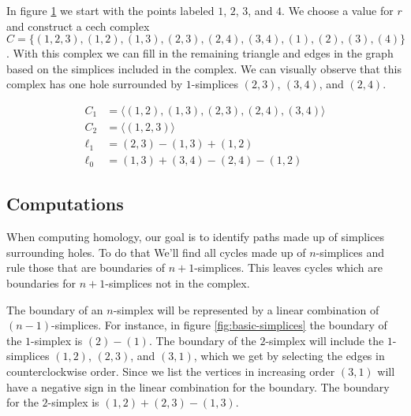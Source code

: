 In figure \ref{fig:example-cech} we start with the points labeled \(1\), \(2\), \(3\), and \(4\). We choose a value for \(r\) and construct a cech complex \(C = \{ (1,2,3), (1,2), (1,3), (2,3), (2,4), (3,4), (1), (2), (3), (4) \}\). With this complex we can fill in the remaining triangle and edges in the graph based on the simplices included in the complex. We can visually observe that this complex has one hole surrounded by \(1\)-simplices \((2,3)\), \((3,4)\), and \((2,4)\).

\begin{figure}
    \centering
    \begin{minipage}{.5\textwidth}
        \centering
        
    \end{minipage}%
    \begin{minipage}{.5\textwidth}
        \begin{align*}
            C_1 &= \langle (1,2),(1,3),(2,3),(2,4),(3,4) \rangle \\
            C_2 &= \langle (1,2,3) \rangle \\
            \ell_1 &= (2,3) - (1,3) + (1,2) \\
            \ell_0 &= (1,3) + (3,4) - (2,4) - (1,2)
        \end{align*}
    \end{minipage}
    \caption{}
    \label{fig:example-cech}
\end{figure}

\subsection{Computations}

When computing homology, our goal is to identify paths made up of simplices surrounding holes. To do that We'll find all cycles made up of \(n\)-simplices and rule those that are boundaries of \(n+1\)-simplices. This leaves cycles which are boundaries for \(n+1\)-simplices not in the complex.

The boundary of an \(n\)-simplex will be represented by a linear combination of \((n-1)\)-simplices. For instance, in figure \ref{fig:basic-simplices} the boundary of the \(1\)-simplex is \((2)-(1)\). The boundary of the \(2\)-simplex will include the \(1\)-simplices \((1,2)\), \((2,3)\), and \((3,1)\), which we get by selecting the edges in counterclockwise order. Since we list the vertices in increasing order \((3,1)\) will have a negative sign in the linear combination for the boundary. The boundary for the \(2\)-simplex is \((1,2) + (2,3) - (1,3)\).

